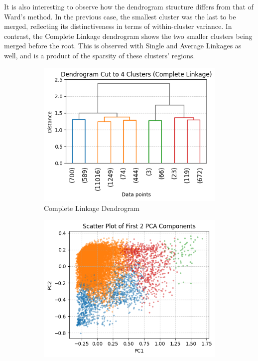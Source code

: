 It is also interesting to observe how the dendrogram structure differs from that of Ward's method.
In the previous case, the smallest cluster was the last to be merged, reflecting its distinctiveness in
terms of within-cluster variance. In contrast, the Complete Linkage dendrogram shows the two smaller
clusters being merged before the root. This is observed with Single and Average Linkages as well, and
is a product of the sparsity of these clusters' regions.
\begin{figure}[H]
    \centering
    \begin{subfigure}[b]{0.49\textwidth}
        \centering
        \includegraphics[width=\textwidth]{plots/dendrogram_complete.png}
        \caption{Complete Linkage Dendrogram}
        \label{fig:dendrogram_complete}
    \end{subfigure}
    \begin{subfigure}[b]{0.49\textwidth}
        \centering
        \includegraphics[width=\textwidth]{plots/scatter_complete.png}

\end{subfigure}
\end{figure}
